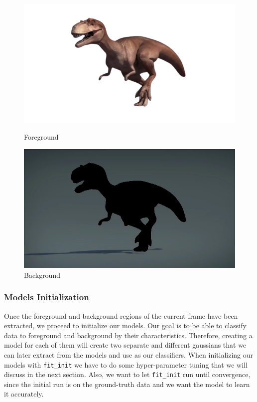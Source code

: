 \begin{figure}[h!]
    \begin{minipage}{0.5\textwidth}
    \centering
    \includegraphics[scale=0.4]{images/dinosaur/foreground_ratio1.0}
    \caption{Foreground}
    \end{minipage}
    \begin{minipage}{0.5\textwidth}
    \centering
    \includegraphics[scale=0.4]{images/dinosaur/background_ratio1.0}
    \caption{Background}
    \end{minipage}\label{fig:foreground extraction}
\end{figure}

\subsubsection{Models Initialization}
Once the foreground and background regions of the current frame have been extracted, we proceed to initialize our models.
Our goal is to be able to classify data to foreground and background by their characteristics.
Therefore, creating a model for each of them will create two separate and different gaussians that we can later extract from the models and use as our classifiers.
When initializing our models with \texttt{fit\_init} we have to do some hyper-parameter tuning that we will discuss in the next section.
Also, we want to let \texttt{fit\_init} run until convergence, since the initial run is on the ground-truth data and we want the model to learn it accurately.
\pagebreak

